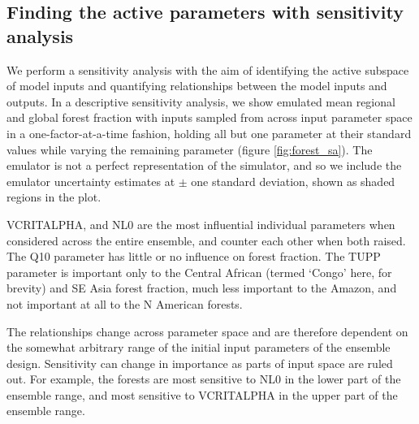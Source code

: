 \documentclass[esd, manuscript]{copernicus}
\begin{document}
\subsection{Finding the active parameters with sensitivity analysis}\label{SA}

We perform a sensitivity analysis with the aim of identifying the active subspace of model inputs and  quantifying relationships between the model inputs and outputs. In a descriptive sensitivity analysis, we show emulated mean regional and global forest fraction with inputs sampled from across input parameter space in a one-factor-at-a-time fashion, holding all but one parameter at their standard values while varying the remaining parameter (figure \ref{fig:forest_sa}). The emulator is not a perfect representation of the simulator, and so we include the emulator uncertainty estimates at $\pm$ one standard deviation, shown as shaded regions in the plot.

VCRITALPHA, and NL0 are the most influential individual parameters when considered across the entire ensemble, and counter each other when both raised. The Q10 parameter has little or no influence on forest fraction. The TUPP parameter is important only to the Central African (termed `Congo' here, for brevity) and SE Asia forest fraction, much less important to the Amazon, and not important at all to the N American forests. 

The relationships change across parameter space and are therefore dependent on the somewhat arbitrary range of the initial input parameters of the ensemble design. Sensitivity can change in importance as parts of input space are ruled out. For example, the forests are most sensitive to NL0 in the lower part of the ensemble range, and most sensitive to VCRITALPHA in the upper part of the ensemble range.

\end{document}
